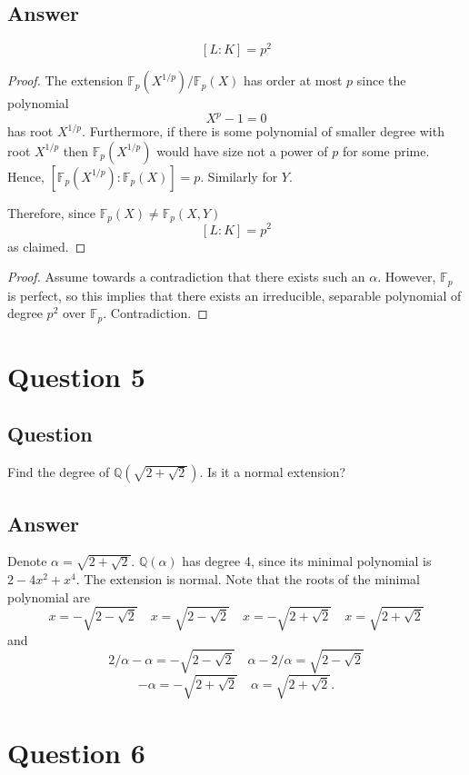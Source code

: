 \documentclass[11pt]{article}
\begin{document}
\subsection{Answer}

\[[L : K] = p^2\]
\begin{proof}
The extension $\mathbb{F}_p(X^{1/p}) / \mathbb{F}_p(X) $ has order at most $p$ since the polynomial 
\[X^p -1 =0\]
has root $X^{1/p}$. Furthermore, if there is some polynomial of smaller degree with root $ X^{1/p}$ then $\mathbb{F}_p(X^{1/p})$ would have size not a power of $p$ for some prime. Hence, $[\mathbb{F}_p(X^{1/p}):\mathbb{F}_p(X)] = p$. Similarly for $Y$.

Therefore, since $\mathbb{F}_p(X) \neq \mathbb{F}_p (X,Y)$ \[[L : K] = p^2\] as claimed.
\end{proof}

\begin{proof}
Assume towards a contradiction that there exists such an $\alpha$. However, $\mathbb{F}_p$ is perfect, so this implies that there exists an irreducible,  separable polynomial of degree $p^2$ over $\mathbb{F}_p$. Contradiction.
\end{proof}

\section{Question 5}
\subsection{Question}
Find the degree of $\mathbb{Q}\left(\sqrt{2+\sqrt 2}\right)$. Is it a normal extension?
\subsection{Answer}
Denote $\alpha = \sqrt{2+\sqrt 2} $.
$\mathbb{Q}\left(\alpha\right)$ has degree 4, since its minimal polynomial is $2-4 x^2+x^4$. The extension is normal. Note that the roots of the minimal polynomial are
\[x= -\sqrt{2-\sqrt{2}}\quad x= \sqrt{2-\sqrt{2}}\quad x= -\sqrt{2+\sqrt{2}}\quad x= \sqrt{2+\sqrt{2}}\] 
and
\[2/\alpha - \alpha= -\sqrt{2-\sqrt{2}}\quad \alpha -2/ \alpha= \sqrt{2-\sqrt{2}}\]\[ - \alpha = -\sqrt{2+\sqrt{2}}\quad \alpha = \sqrt{2+\sqrt{2}}.\] 
\section{Question 6}
\end{document}
